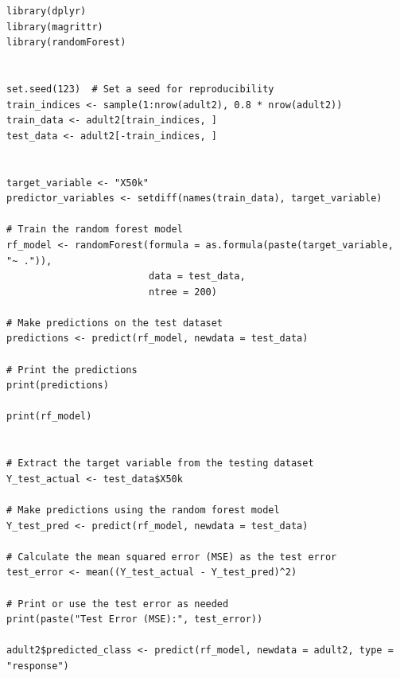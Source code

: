 \documentclass{article}
\begin{document}
\begin{verbatim}
library(dplyr)
library(magrittr)
library(randomForest)


set.seed(123)  # Set a seed for reproducibility
train_indices <- sample(1:nrow(adult2), 0.8 * nrow(adult2))
train_data <- adult2[train_indices, ]
test_data <- adult2[-train_indices, ] 


target_variable <- "X50k"
predictor_variables <- setdiff(names(train_data), target_variable)

# Train the random forest model
rf_model <- randomForest(formula = as.formula(paste(target_variable, "~ .")),
                         data = test_data,
                         ntree = 200)

# Make predictions on the test dataset
predictions <- predict(rf_model, newdata = test_data)

# Print the predictions
print(predictions)

print(rf_model)


# Extract the target variable from the testing dataset
Y_test_actual <- test_data$X50k

# Make predictions using the random forest model
Y_test_pred <- predict(rf_model, newdata = test_data)

# Calculate the mean squared error (MSE) as the test error
test_error <- mean((Y_test_actual - Y_test_pred)^2)

# Print or use the test error as needed
print(paste("Test Error (MSE):", test_error))

adult2$predicted_class <- predict(rf_model, newdata = adult2, type = "response")

\end{verbatim}
\end{document}
